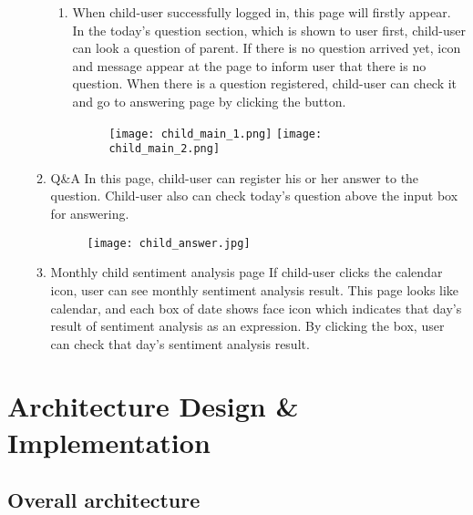 \documentclass[conference]{IEEEtran}
\begin{document}
\begin{enumerate}
\begin{enumerate}
            \begin{enumerate}
                \item When child-user successfully logged in, this page will firstly appear. In the today’s question section, which is shown to user first, child-user can look a question of parent. If there is no question arrived yet, icon and message appear at the page to inform user that there is no question. When there is a question registered, child-user can check it and go to answering page by clicking the button.
                \begin{figure}[H]
                 \centering
                 \texttt{[image: child\_main\_1.png]}
                 \texttt{[image: child\_main\_2.png]}
                 \end{figure}
                 
            \end{enumerate}
            \item Q\&A \hfill\break
            In this page, child-user can register his or her answer to the question. Child-user also can check today’s question above the input box for answering.
            \begin{figure}[H]
                 \centering
                 \texttt{[image: child\_answer.jpg]}
                 \end{figure}
            \item Monthly child sentiment analysis page \hfill \break
            If child-user clicks the calendar icon, user can see monthly sentiment analysis result. This page looks like calendar, and each box of date shows face icon which indicates that day’s result of sentiment analysis as an expression. By clicking the box, user can check that day’s sentiment analysis result.
        \end{enumerate}
        \end{enumerate}
        
\section{Architecture Design \& Implementation}
    \subsection{Overall architecture}
    
    

    
\end{document}
